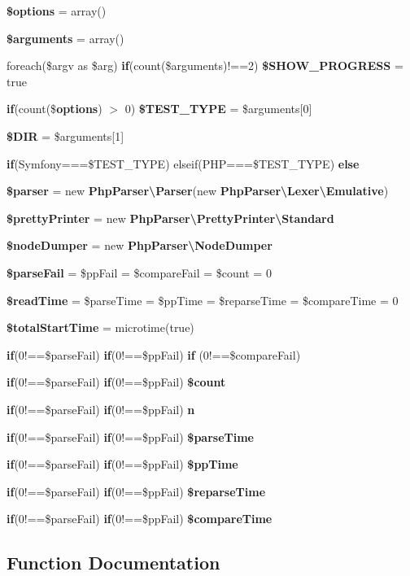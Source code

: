 \begin{DoxyCompactItemize}
\item 
{\bf \$options} = array()
\item 
{\bf \$arguments} = array()
\item 
foreach(\$argv as \$arg) {\bf if}(count(\$arguments)!==2) {\bf \$\+S\+H\+O\+W\+\_\+\+P\+R\+O\+G\+R\+E\+S\+S} = true
\item 
{\bf if}(count(\${\bf options}) $>$ 0) {\bf \$\+T\+E\+S\+T\+\_\+\+T\+Y\+P\+E} = \$arguments[0]
\item 
{\bf \$\+D\+I\+R} = \$arguments[1]
\item 
{\bf if}(\textquotesingle{}Symfony\textquotesingle{}===\$T\+E\+S\+T\+\_\+\+T\+Y\+P\+E) elseif(\textquotesingle{}P\+H\+P\textquotesingle{}===\$T\+E\+S\+T\+\_\+\+T\+Y\+P\+E) {\bf else}
\item 
{\bf \$parser} = new {\bf Php\+Parser\textbackslash{}\+Parser}(new {\bf Php\+Parser\textbackslash{}\+Lexer\textbackslash{}\+Emulative})
\item 
{\bf \$pretty\+Printer} = new {\bf Php\+Parser\textbackslash{}\+Pretty\+Printer\textbackslash{}\+Standard}
\item 
{\bf \$node\+Dumper} = new {\bf Php\+Parser\textbackslash{}\+Node\+Dumper}
\item 
{\bf \$parse\+Fail} = \$pp\+Fail = \$compare\+Fail = \$count = 0
\item 
{\bf \$read\+Time} = \$parse\+Time = \$pp\+Time = \$reparse\+Time = \$compare\+Time = 0
\item 
{\bf \$total\+Start\+Time} = microtime(true)
\item 
{\bf if}(0!==\$parse\+Fail) {\bf if}(0!==\$pp\+Fail) {\bf if} (0!==\$compare\+Fail)
\item 
{\bf if}(0!==\$parse\+Fail) {\bf if}(0!==\$pp\+Fail) {\bf \$count}
\item 
{\bf if}(0!==\$parse\+Fail) {\bf if}(0!==\$pp\+Fail) {\bf n}
\item 
{\bf if}(0!==\$parse\+Fail) {\bf if}(0!==\$pp\+Fail) {\bf \$parse\+Time}
\item 
{\bf if}(0!==\$parse\+Fail) {\bf if}(0!==\$pp\+Fail) {\bf \$pp\+Time}
\item 
{\bf if}(0!==\$parse\+Fail) {\bf if}(0!==\$pp\+Fail) {\bf \$reparse\+Time}
\item 
{\bf if}(0!==\$parse\+Fail) {\bf if}(0!==\$pp\+Fail) {\bf \$compare\+Time}
\end{DoxyCompactItemize}


\subsection{Function Documentation}
